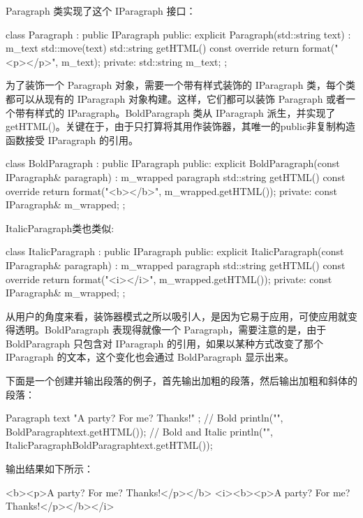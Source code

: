 Paragraph 类实现了这个 IParagraph 接口：

\begin{cpp}
class Paragraph : public IParagraph
{
    public:
        explicit Paragraph(std::string text) : m_text { std::move(text) } {}
        std::string getHTML() const override {return format("<p>{}</p>", m_text); }
    private:
        std::string m_text;
};
\end{cpp}

为了装饰一个 Paragraph 对象，需要一个带有样式装饰的 IParagraph 类，每个类都可以从现有的 IParagraph 对象构建。这样，它们都可以装饰 Paragraph 或者一个带有样式的 IParagraph。BoldParagraph 类从 IParagraph 派生，并实现了 getHTML()。关键在于，由于只打算将其用作装饰器，其唯一的public非复制构造函数接受 IParagraph 的引用。

\begin{cpp}
class BoldParagraph : public IParagraph
{
    public:
        explicit BoldParagraph(const IParagraph& paragraph)
        : m_wrapped { paragraph } { }
        std::string getHTML() const override {
            return format("<b>{}</b>", m_wrapped.getHTML()); }
    private:
        const IParagraph& m_wrapped;
};
\end{cpp}

ItalicParagraph类也类似:

\begin{cpp}
class ItalicParagraph : public IParagraph
{
    public:
        explicit ItalicParagraph(const IParagraph& paragraph)
        : m_wrapped { paragraph } { }
        std::string getHTML() const override {
            return format("<i>{}</i>", m_wrapped.getHTML()); }
    private:
        const IParagraph& m_wrapped;
};
\end{cpp}


从用户的角度来看，装饰器模式之所以吸引人，是因为它易于应用，可使应用就变得透明。BoldParagraph 表现得就像一个 Paragraph，需要注意的是，由于 BoldParagraph 只包含对 IParagraph 的引用，如果以某种方式改变了那个 IParagraph 的文本，这个变化也会通过 BoldParagraph 显示出来。

下面是一个创建并输出段落的例子，首先输出加粗的段落，然后输出加粗和斜体的段落：

\begin{cpp}
Paragraph text { "A party? For me? Thanks!" };
// Bold
println("{}", BoldParagraph{text}.getHTML());
// Bold and Italic
println("{}", ItalicParagraph{BoldParagraph{text}}.getHTML());
\end{cpp}

输出结果如下所示：

\begin{shell}
<b><p>A party? For me? Thanks!</p></b>
<i><b><p>A party? For me? Thanks!</p></b></i>
\end{shell}
















